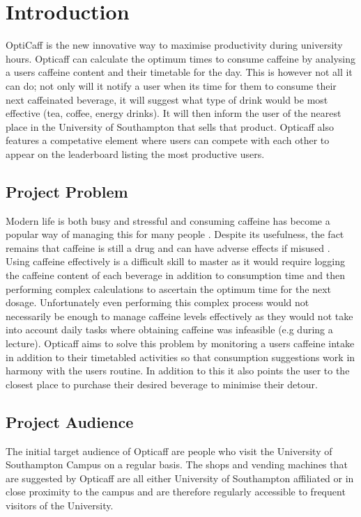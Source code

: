 \section{Introduction}

OptiCaff is the new innovative way to maximise productivity during university hours. 
Opticaff can calculate the optimum times to consume caffeine by analysing a users caffeine content and their timetable for the day. 
This is however not all it can do; not only will it notify a user when its time for them to consume their next caffeinated beverage, it will suggest what type of drink would be most effective (tea, coffee, energy drinks). 
It will then inform the user of the nearest place in the University of Southampton that sells that product.
Opticaff also features a competative element where users can compete with each other to appear on the leaderboard listing the most productive users.  

\subsection{Project Problem}
Modern life is both busy and stressful and consuming caffeine has become a popular way of managing this for many people \cite{Popularity}.
Despite its usefulness, the fact remains that caffeine is still a drug and can have adverse effects if misused \cite{misuse}.
Using caffeine effectively is a difficult skill to master as it would require logging the caffeine content of each beverage in addition to consumption time and then performing complex calculations to ascertain the optimum time for the next dosage.
Unfortunately even performing this complex process would not necessarily be enough to manage caffeine levels effectively as they would not take into account daily tasks where obtaining caffeine was infeasible (e.g during a lecture). 
Opticaff aims to solve this problem by monitoring a users caffeine intake in addition to their timetabled activities so that consumption suggestions work in harmony with the users routine.
In addition to this it also points the user to the closest place to purchase their desired beverage to minimise their detour.  
  
\subsection{Project Audience}
The initial target audience of Opticaff are people who visit the University of Southampton Campus on a regular basis. 
The shops and vending machines that are suggested by Opticaff are all either University of Southampton affiliated or in close proximity to the campus and are therefore regularly accessible to frequent visitors of the University.

